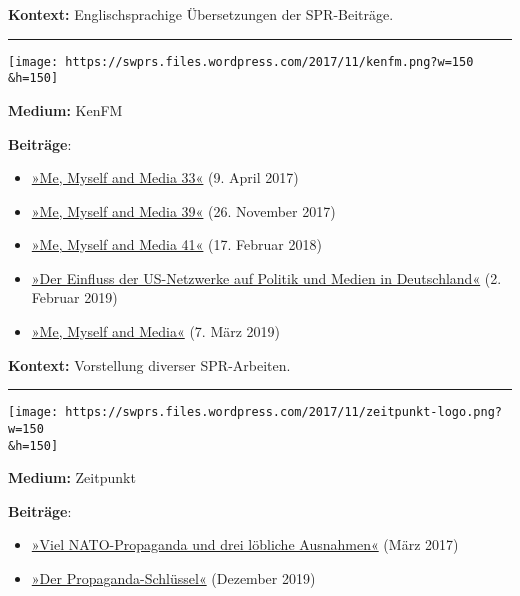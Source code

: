 \textbf{Kontext:} Englischsprachige Übersetzungen der SPR-Beiträge.

\begin{center}\rule{0.5\linewidth}{\linethickness}\end{center}

\texttt{[image: https://swprs.files.wordpress.com/2017/11/kenfm.png?w=150\\\&h=150]}

\textbf{Medium:} KenFM

\textbf{Beiträge}:

\begin{itemize}
\tightlist
\item
  \href{https://kenfm.de/me-myself-and-media-33-du-sollst-dir-kein-feinbild-machen/}{»Me,
  Myself and Media 33«} (9. April 2017)
\item
  \href{https://kenfm.de/me-myself-and-media-39/}{»Me, Myself and Media
  39«} (26. November 2017)
\item
  \href{https://kenfm.de/me-myself-and-media-41/}{»Me, Myself and Media
  41«} (17. Februar 2018)
\item
  \href{https://kenfm.de/der-einfluss-der-us-netzwerke-auf-politik-und-medien-in-deutschland/}{»Der
  Einfluss der US-Netzwerke auf Politik und Medien in Deutschland«} (2.
  Februar 2019)
\item
  \href{https://kenfm.de/me-myself-and-media-50/}{»Me, Myself and
  Media«} (7. März 2019)
\end{itemize}

\textbf{Kontext:} Vorstellung diverser SPR-Arbeiten.

\begin{center}\rule{0.5\linewidth}{\linethickness}\end{center}

\texttt{[image: https://swprs.files.wordpress.com/2017/11/zeitpunkt-logo.png?w=150\\\&h=150]}

\textbf{Medium:} Zeitpunkt

\textbf{Beiträge}:

\begin{itemize}
\tightlist
\item
  \href{http://www.zeitpunkt.ch/news/artikel-einzelansicht/artikel/mediennavigator-viel-nato-propaganda-und-drei-loebliche}{»Viel
  NATO-Propaganda und drei löbliche Ausnahmen«} (März 2017)
\item
  \href{https://www.zeitpunkt.ch/der-propaganda-schluessel}{»Der
  Propaganda-Schlüssel«} (Dezember 2019)
\end{itemize}

